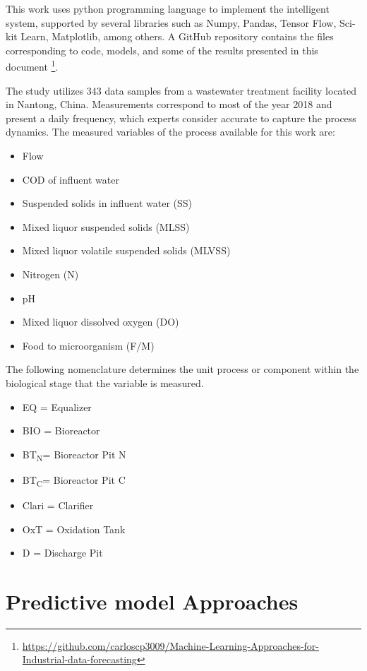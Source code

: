 This work uses python programming language to implement the intelligent system, supported by several libraries such as Numpy, Pandas, Tensor Flow, Sci-kit Learn, Matplotlib, among others. A GitHub repository contains the files corresponding to code, models, and some of the results presented in this document \footnote{\url{https://github.com/carloscp3009/Machine-Learning-Approaches-for-Industrial-data-forecasting}}. 

The study utilizes 343 data samples from a wastewater treatment facility located in Nantong, China. Measurements correspond to most of the year 2018 and present a daily frequency, which experts consider accurate to capture the process dynamics. The measured variables of the process available for this work are:

\begin{itemize}
 \item	Flow
 \item	COD of influent water
 \item	Suspended solids in influent water (SS)
 \item	Mixed liquor suspended solids (MLSS)
 \item	Mixed liquor volatile suspended solids (MLVSS)
 \item	Nitrogen (N)
 \item	pH
 \item	Mixed liquor dissolved oxygen (DO)
 \item	Food to microorganism (F/M)
\end{itemize}

The following nomenclature determines the unit process or component within the biological stage that the variable is measured.

\begin{itemize}
 \item	EQ = Equalizer
 \item	BIO = Bioreactor
 \item	BT\textsubscript{N}= Bioreactor Pit N
 \item	BT\textsubscript{C}= Bioreactor Pit C
 \item	Clari = Clarifier
 \item	OxT = Oxidation Tank
 \item	D = Discharge Pit
\end{itemize}

\section{Predictive model Approaches}
\label{s:model-design}

